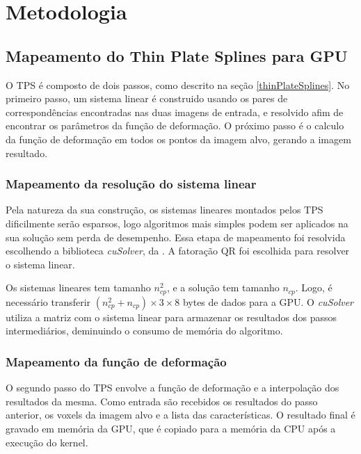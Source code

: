 \chapter{Metodologia}
\label{cap:metodologia}

\section{Mapeamento do Thin Plate Splines para GPU}

  O TPS é composto de dois passos, como descrito na seção \ref{thinPlateSplines}.
No primeiro passo, um sistema linear é construido usando os pares de correspondências
encontradas nas duas imagens de entrada, e resolvido afim de encontrar os parâmetros
da função de deformação. O próximo passo é o calculo da função de deformação em
todos os pontos da imagem alvo, gerando a imagem resultado.

\subsection{Mapeamento da resolução do sistema linear}

  Pela natureza da sua construção, os sistemas lineares montados pelos TPS dificilmente
serão esparsos, logo algoritmos mais simples podem ser aplicados na sua solução
sem perda de desempenho. Essa etapa de mapeamento foi resolvida escolhendo a
biblioteca \textit{cuSolver}, da \cite{cuSolver}. A fatoração QR foi escolhida
para resolver o sistema linear.

  Os sistemas lineares tem tamanho $n_{cp}^2$, e a solução tem tamanho $n_{cp}$.
Logo, é necessário transferir $(n_{cp}^2 + n_{cp}) \times 3 \times 8$ bytes de
dados para a GPU. O \textit{cuSolver} utiliza a matriz com o sistema linear para
armazenar os resultados dos passos intermediários, deminuindo o consumo de memória
do algoritmo.

\subsection{Mapeamento da função de deformação}\label{segundoPasso}

  O segundo passo do TPS envolve a função de deformação e a interpolação dos
resultados da mesma. Como entrada são recebidos os resultados do passo anterior,
os voxels da imagem alvo e a lista das características. O resultado final é gravado
em memória da GPU, que é copiado para a memória da CPU após a execução do kernel.

